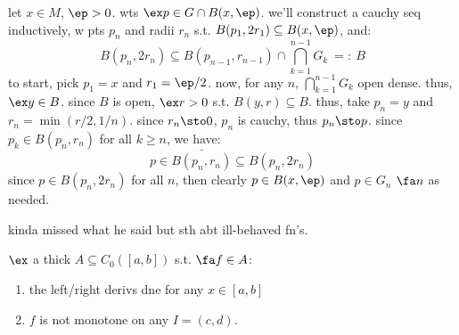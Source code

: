 \begin{pf}[source=Primary Source Material]
	let $x\in M$, $\ep>0$. wts $\ex p\in G\cap B(x,\ep)$.
	we'll construct a cauchy seq inductively, w pts $p_{n}$ and radii $r_{n}$ s.t.
	$B(p_{1},2r_{1})\subseteq B(x,\ep)$, and:
	\begin{equation*}
		B(p_{n},2r_{n})\subseteq B(p_{n-1},r_{n-1})\cap \bigcap_{k=1}^{n-1}G_{k}
		\ =: \ B
	\end{equation*}
	to start, pick $p_{1}=x$ and $r_{1}=\ep/2$.
	now, for any $n$, $\bigcap_{k=1}^{n-1}G_{k}$ open dense. thus, $\ex y \in B$.
	since $B$ is open, $\ex r>0$ s.t. $B(y,r)\subseteq B$.
	thus, take $p_{n}=y$ and $r_{n}=\min(r/2,1/n)$.
	since $r_{n}\sto0$, $p_{n}$ is cauchy, thus $p_{n}\sto p$.
	since $p_{k}\in B(p_{n},r_{n})$ for all $k\geq n$, we have:
	\begin{equation*}
		p\in\bar{B(p_{n},r_{n})}\subseteq B(p_{n},2r_{n})
	\end{equation*}
	since $p\in B(p_{n},2r_{n})$ for all $n$, then clearly $p\in B(x,\ep)$ and $p\in G_{n}$ $\fa n$
	as needed.
\end{pf}
kinda missed what he said but sth abt ill-behaved fn's.

\begin{prop}
	$\ex$ a thick $A\subseteq C_{0}([a,b])$ s.t. $\fa f\in A$:
	\begin{enumerate}
		\item the left/right derivs dne for any $x\in[a,b]$
		\item $f$ is not monotone on any $I=(c,d)$.
	\end{enumerate}
\end{prop} \

